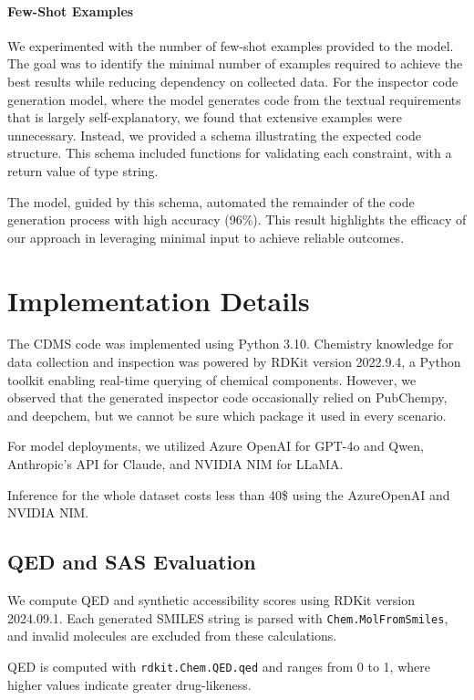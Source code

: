 \documentclass[10pt]{article} %
\begin{document}
    \paragraph{Few-Shot Examples}
    We experimented with the number of few-shot examples provided to the model. The goal was to identify the minimal number of examples required to achieve the best results while reducing dependency on collected data. For the inspector code generation model, where the model generates code from the textual requirements that is largely self-explanatory, we found that extensive examples were unnecessary. Instead, we provided a schema illustrating the expected code structure. This schema included functions for validating each constraint, with a return value of type string.

    The model, guided by this schema, automated the remainder of the code generation process with high accuracy (96\%). This result highlights the efficacy of our approach in leveraging minimal input to achieve reliable outcomes.


    \section{Implementation Details}
    The CDMS code was implemented using Python 3.10. Chemistry knowledge for data collection and inspection was powered by RDKit\cite{rdkit} version 2022.9.4, a Python toolkit enabling real-time querying of chemical components. However, we observed that the generated inspector code occasionally relied on PubChempy\cite{kim2023pubchem}, and deepchem\cite{deepchem}, but we cannot be sure which package it used in every scenario.

    For model deployments, we utilized Azure OpenAI for GPT-4o and Qwen, Anthropic's API for Claude, and NVIDIA NIM for LLaMA.

    Inference for the whole dataset costs less than 40\$ using the AzureOpenAI and NVIDIA NIM.

    \subsection{QED and SAS Evaluation}
    \label{app:qed_sas_evaluation}
    
    We compute QED and synthetic accessibility scores using RDKit version 2024.09.1. Each generated SMILES string is parsed with \texttt{Chem.MolFromSmiles}, and invalid molecules are excluded from these calculations.
    
    QED is computed with \texttt{rdkit.Chem.QED.qed} and ranges from 0 to 1, where higher values indicate greater drug-likeness.
    
\end{document}
